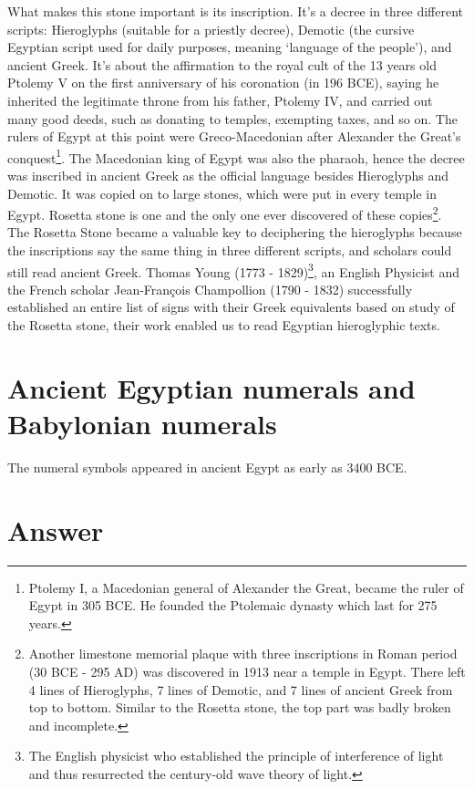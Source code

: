 \documentclass[b5paper]{article}
\begin{document}
What makes this stone important is its inscription. It's a decree in three different scripts: Hieroglyphs (suitable for a priestly decree), Demotic (the cursive Egyptian script used for daily purposes, meaning `language of the people'), and ancient Greek. It's about the affirmation to the royal cult of the 13 years old Ptolemy V on the first anniversary of his coronation (in 196 BCE), saying he inherited the legitimate throne from his father, Ptolemy IV, and carried out many good deeds, such as donating to temples, exempting taxes, and so on. The rulers of Egypt at this point were Greco-Macedonian after Alexander the Great's conquest\footnote{Ptolemy I, a Macedonian general of Alexander the Great, became the ruler of Egypt in 305 BCE. He founded the Ptolemaic dynasty which last for 275 years.}. The Macedonian king of Egypt was also the pharaoh, hence the decree was inscribed in ancient Greek as the official language besides Hieroglyphs and Demotic. It was copied on to large stones, which were put in every temple in Egypt. Rosetta stone is one and the only one ever discovered of these copies\footnote{Another limestone memorial plaque with three inscriptions in Roman period (30 BCE - 295 AD) was discovered in 1913 near a temple in Egypt. There left 4 lines of Hieroglyphs, 7 lines of Demotic, and 7 lines of ancient Greek from top to bottom. Similar to the Rosetta stone, the top part was badly broken and incomplete\cite{SH-Museum-24}.}. The Rosetta Stone became a valuable key to deciphering the hieroglyphs because the inscriptions say the same thing in three different scripts, and scholars could still read ancient Greek. Thomas Young (1773 - 1829)\footnote{The English physicist who established the principle of interference of light and thus resurrected the century-old wave theory of light.}, an English Physicist and the French scholar Jean-François Champollion (1790 - 1832) successfully established an entire list of signs with their Greek equivalents based on study of the Rosetta stone, their work enabled us to read Egyptian hieroglyphic texts\cite{BM-RS-17}.

\section{Ancient Egyptian numerals and Babylonian numerals}

The numeral symbols appeared in ancient Egypt as early as 3400 BCE.

\ifx\wholebook\relax \else
\section{Answer}
\shipoutAnswer
\end{document}
